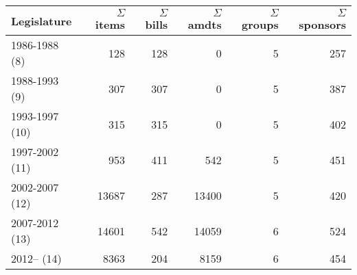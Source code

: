 \begin{tabular}{lrrrrr}
  \hline
Legislature & $\Sigma$~items & $\Sigma$~bills & $\Sigma$~amdts & $\Sigma$~groups & $\Sigma$~sponsors \\ 
  \hline
1986-1988 (8) & 128 & 128 &   0 &   5 & 257 \\ 
  1988-1993 (9) & 307 & 307 &   0 &   5 & 387 \\ 
  1993-1997 (10) & 315 & 315 &   0 &   5 & 402 \\ 
  1997-2002 (11) & 953 & 411 & 542 &   5 & 451 \\ 
  2002-2007 (12) & 13687 & 287 & 13400 &   5 & 420 \\ 
  2007-2012 (13) & 14601 & 542 & 14059 &   6 & 524 \\ 
  2012-- (14) & 8363 & 204 & 8159 &   6 & 454 \\ 
   \hline
\end{tabular}
